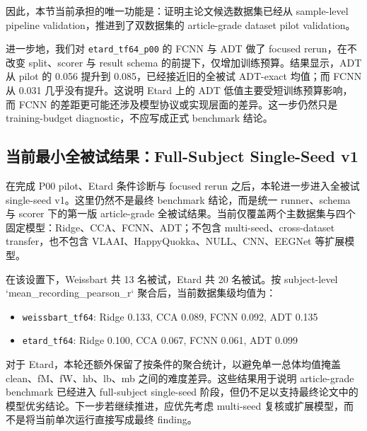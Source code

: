 因此，本节当前承担的唯一功能是：证明主论文候选数据集已经从 sample-level pipeline validation，推进到了双数据集的 article-grade dataset pilot validation。

进一步地，我们对 \texttt{etard\_tf64\_p00} 的 FCNN 与 ADT 做了 focused rerun，在不改变 split、scorer 与 result schema 的前提下，仅增加训练预算。结果显示，ADT 从 pilot 的 0.056 提升到 0.085，已经接近旧的全被试 ADT-exact 均值；而 FCNN 从 0.031 几乎没有提升。这说明 Etard 上的 ADT 低值主要受短训练预算影响，而 FCNN 的差距更可能还涉及模型协议或实现层面的差异。这一步仍然只是 training-budget diagnostic，不应写成正式 benchmark 结论。


\subsection{当前最小全被试结果：Full-Subject Single-Seed v1}

在完成 P00 pilot、Etard 条件诊断与 focused rerun 之后，本轮进一步进入全被试 single-seed v1。这里仍然不是最终 benchmark 结论，而是统一 runner、schema 与 scorer 下的第一版 article-grade 全被试结果。当前仅覆盖两个主数据集与四个固定模型：Ridge、CCA、FCNN、ADT；不包含 multi-seed、cross-dataset transfer，也不包含 VLAAI、HappyQuokka、NULL、CNN、EEGNet 等扩展模型。

在该设置下，Weissbart 共 13 名被试，Etard 共 20 名被试。按 subject-level `mean_recording_pearson_r` 聚合后，当前数据集级均值为：
\begin{itemize}
  \item \texttt{weissbart\_tf64}: Ridge 0.133, CCA 0.089, FCNN 0.092, ADT 0.135
  \item \texttt{etard\_tf64}: Ridge 0.100, CCA 0.067, FCNN 0.061, ADT 0.099
\end{itemize}

对于 Etard，本轮还额外保留了按条件的聚合统计，以避免单一总体均值掩盖 clean、fM、fW、hb、lb、mb 之间的难度差异。这些结果用于说明 article-grade benchmark 已经进入 full-subject single-seed 阶段，但仍不足以支持最终论文中的模型优劣结论。下一步若继续推进，应优先考虑 multi-seed 复核或扩展模型，而不是将当前单次运行直接写成最终 finding。
